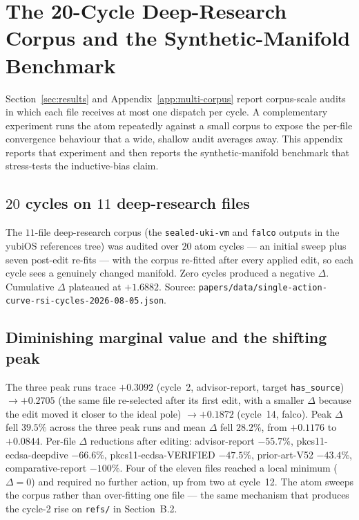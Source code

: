 \documentclass[11pt,a4paper]{article}
\theoremstyle{plain}
\theoremstyle{remark}
\theoremstyle{plain}
\begin{document}
\section{The 20-Cycle Deep-Research Corpus and the Synthetic-Manifold Benchmark}
\label{app:20cycle}

Section~\ref{sec:results} and Appendix~\ref{app:multi-corpus} report corpus-scale audits in which each file receives at most one dispatch per cycle. A complementary experiment runs the atom repeatedly against a small corpus to expose the per-file convergence behaviour that a wide, shallow audit averages away. This appendix reports that experiment and then reports the synthetic-manifold benchmark that stress-tests the inductive-bias claim.

\subsection{$20$ cycles on $11$ deep-research files}

The $11$-file deep-research corpus (the \texttt{sealed-uki-vm} and \texttt{falco} outputs in the yubiOS references tree) was audited over $20$ atom cycles --- an initial sweep plus seven post-edit re-fits --- with the corpus re-fitted after every applied edit, so each cycle sees a genuinely changed manifold. Zero cycles produced a negative $\Delta$. Cumulative $\Delta$ plateaued at $+1.6882$. Source: \texttt{papers/data/single-action-curve-rsi-cycles-2026-08-05.json}.

\subsection{Diminishing marginal value and the shifting peak}

The three peak runs trace $+0.3092$ (cycle~2, advisor-report, target \texttt{has\_source}) $\to +0.2705$ (the same file re-selected after its first edit, with a smaller $\Delta$ because the edit moved it closer to the ideal pole) $\to +0.1872$ (cycle~14, falco). Peak $\Delta$ fell $39.5\%$ across the three peak runs and mean $\Delta$ fell $28.2\%$, from $+0.1176$ to $+0.0844$. Per-file $\Delta$ reductions after editing: advisor-report $-55.7\%$, pkcs11-ecdsa-deepdive $-66.6\%$, pkcs11-ecdsa-VERIFIED $-47.5\%$, prior-art-V52 $-43.4\%$, comparative-report $-100\%$. Four of the eleven files reached a local minimum ($\Delta = 0$) and required no further action, up from two at cycle~12. The atom sweeps the corpus rather than over-fitting one file --- the same mechanism that produces the cycle-2 rise on \texttt{refs/} in Section~B.2.
\end{document}
